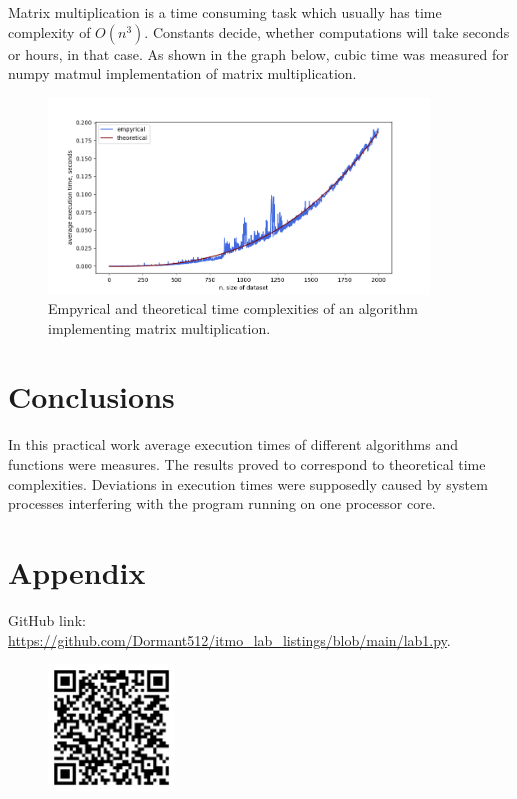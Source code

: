 \documentclass[12pt, a4paper]{article}
\begin{document}
Matrix multiplication is a time consuming task which usually has time complexity of $O(n^3)$. Constants decide, whether computations will take seconds or hours, in that case. As shown in the graph below, cubic time was measured for numpy matmul implementation of matrix multiplication.
\begin{figure}[!h]
\centering
\includegraphics[width=0.9\textwidth]{matmul.png}
\caption{Empyrical and theoretical time complexities of an algorithm implementing matrix multiplication.}
\end{figure}

\section*{Conclusions}

In this practical work average execution times of different algorithms and functions were measures. The results proved to correspond to theoretical time complexities. Deviations in execution times were supposedly caused by system processes interfering with the program running on one processor core.

\section*{Appendix}

GitHub link: \url{https://github.com/Dormant512/itmo_lab_listings/blob/main/lab1.py}.

\begin{figure}[!h]
\centering
\includegraphics[width=0.3\textwidth]{qr_lab1.png}
\end{figure}
\end{document}
